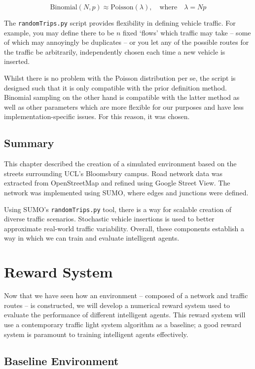 \documentclass[a4paper]{report}
\begin{document}
\[
\mathrm{Binomial}(N, p) \approx \mathrm{Poisson}(\lambda),
\quad \text{where} \quad \lambda = Np
\]

The \texttt{randomTrips.py} script provides flexibility in defining vehicle traffic. For example, you may define there to be \( n \) fixed `flows' which traffic may take -- some of which may annoyingly be duplicates -- or you let any of the possible routes for the traffic be arbitrarily, independently chosen each time a new vehicle is inserted.

Whilst there is no problem with the Poisson distribution per se, the script is designed such that it is only compatible with the prior definition method. Binomial sampling on the other hand is compatible with the latter method as well as other parameters which are more flexible for our purposes and have less implementation-specific issues. For this reason, it was chosen.

\section{Summary}

This chapter described the creation of a simulated environment based on the streets surrounding UCL's Bloomsbury campus. Road network data was extracted from OpenStreetMap and refined using Google Street View. The network was implemented using SUMO, where edges and junctions were defined.

Using SUMO's \texttt{randomTrips.py} tool, there is a way for scalable creation of diverse traffic scenarios. Stochastic vehicle insertions is used to better approximate real-world traffic variability. Overall, these components establish a way in which we can train and evaluate intelligent agents.

\chapter{Reward System}

Now that we have seen how an environment -- composed of a network and traffic routes -- is constructed, we will develop a numerical reward system used to evaluate the performance of different intelligent agents. This reward system will use a contemporary traffic light system algorithm as a baseline; a good reward system is paramount to training intelligent agents effectively.

\section{Baseline Environment}
\end{document}
